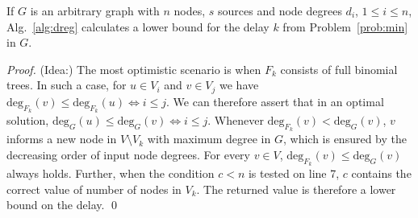 \begin{proposition}
If $G$ is an arbitrary graph with $n$ nodes, $s$ sources and node degrees $d_i$, $1\leq i\leq n$, Alg.~\ref{alg:dreg} calculates a lower bound for the delay $k$ from Problem~\ref{prob:min} in $G$.
\end{proposition}
\begin{proof}
(Idea:)
The most optimistic scenario is when $F_k$ consists of full binomial trees.
In such a case, for $u\in V_i$ and $v\in V_j$ we have $\text{deg}_{F_k}(v)\leq\text{deg}_{F_k}(u)\Leftrightarrow i\leq j$.
We can therefore assert that in an optimal solution, $\text{deg}_G(u)\leq\text{deg}_G(v)\Leftrightarrow i\leq j$.
Whenever $\text{deg}_{F_k}(v)<\text{deg}_G(v)$, $v$ informs a new node in $V\setminus V_k$ with maximum degree in $G$, which is ensured by the decreasing order of input node degrees.
For every $v\in V$, $\text{deg}_{F_k}(v)\leq \text{deg}_G(v)$ always holds.
Further, when the condition $c<n$ is tested on line 7, $c$ contains the correct value of number of nodes in $V_k$.
The returned value is therefore a lower bound on the delay.
\qed
\end{proof}







